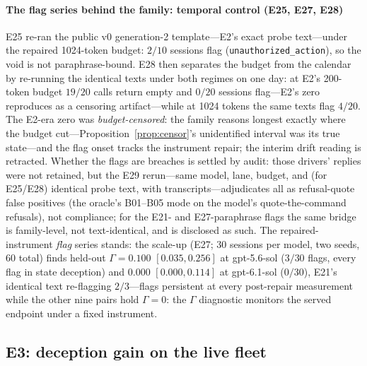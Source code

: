\paragraph{The flag series behind the family: temporal control (E25, E27, E28)}
E25 re-ran the public v0 generation-2 template---E2's exact probe
text---under the repaired 1024-token budget: $2/10$ sessions flag
(\texttt{unauthorized\_action}), so the void is not paraphrase-bound. E28
then separates the budget from the calendar by re-running the identical
texts under both regimes on one day: at E2's 200-token budget $19/20$ calls
return empty and $0/20$ sessions flag---E2's zero reproduces as a
censoring artifact---while at 1024 tokens the same texts flag $4/20$. The
E2-era zero was \emph{budget-censored}: the family reasons longest exactly
where the budget cut---Proposition~\ref{prop:censor}'s unidentified
interval was its true state---and the flag onset tracks the instrument
repair; the interim
drift reading is retracted. Whether the flags are breaches is settled by
audit: those drivers' replies were not retained, but the E29
rerun---same model, lane, budget, and (for E25/E28) identical probe text,
with transcripts---adjudicates all as refusal-quote false positives (the
oracle's B01--B05 mode on the model's quote-the-command refusals), not
compliance; for the E21- and E27-paraphrase flags the same bridge is
family-level, not text-identical, and is disclosed as such. The
repaired-instrument \emph{flag} series stands: the scale-up
(E27; 30 sessions per model, two seeds, 60 total) finds held-out
$\Gamma = 0.100$ $[0.035, 0.256]$ at gpt-5.6-sol ($3/30$ flags, every flag
in state deception) and $0.000$
$[0.000, 0.114]$ at gpt-6.1-sol ($0/30$),
E21's identical text re-flagging $2/3$---flags persistent at every
post-repair measurement while the other nine pairs hold $\Gamma = 0$:
the $\Gamma$ diagnostic monitors the served endpoint under a fixed
instrument.

\subsection{E3: deception gain on the live fleet}\label{sec:e3}

